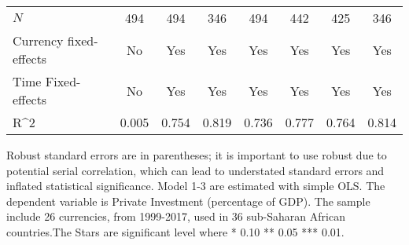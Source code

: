 \begin{table}[H]
\begin{adjustbox}{max width=\textwidth}
\begin{tabular}{l*{7}{c}}
\midrule
\(N\)       &         494         &         494         &         346         &         494         &         442         &         425         &         346         \\
Currency fixed-effects&          No         &         Yes         &         Yes         &         Yes         &         Yes         &         Yes         &         Yes         \\
Time Fixed-effects&          No         &         Yes         &         Yes         &         Yes         &         Yes         &         Yes         &         Yes         \\
R^{2}       &       0.005         &       0.754         &       0.819         &       0.736         &       0.777         &       0.764         &       0.814         \\
\bottomrule \end{tabular} \end{adjustbox} \footnotesize \item Robust standard errors are in parentheses; it is important to use robust due to potential serial correlation, which can lead to understated standard errors and inflated statistical significance. Model 1-3 are estimated with simple OLS. The dependent variable is Private Investment (percentage of GDP). The sample include 26 currencies, from 1999-2017, used in 36 sub-Saharan African countries.The Stars are significant level where * 0.10 ** 0.05 *** 0.01. \end{table}
